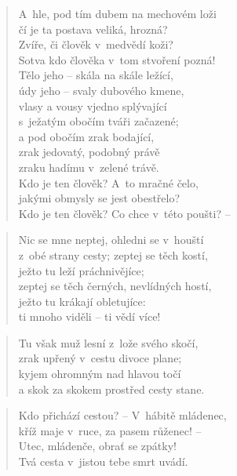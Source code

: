 \begin{verse}
A~hle, pod tím dubem na mechovém loži \\
čí je ta postava veliká, hrozná? \\
Zvíře, či člověk v~medvědí koži? \\
Sotva kdo člověka v~tom stvoření pozná! \\
Tělo jeho -- skála na skále ležící, \\
údy jeho -- svaly dubového kmene, \\
vlasy a vousy vjedno splývající \\
s~ježatým obočím tváři začazené; \\
a pod obočím zrak bodající, \\
zrak jedovatý, podobný právě \\
zraku hadímu v~zelené trávě. \\
Kdo je ten člověk? A~to mračné čelo, \\
jakými obmysly se jest obestřelo? \\
Kdo je ten člověk? Co chce v~této poušti? --
\end{verse}

\begin{verse}
Nic se mne neptej, ohledni se v~houští \\
z~obé strany cesty; zeptej se těch kostí, \\
ježto tu leží práchnivějíce; \\
zeptej se těch černých, nevlídných hostí, \\
ježto tu krákají obletujíce: \\
ti mnoho viděli -- ti vědí více!
\end{verse}

\begin{verse}
Tu však muž lesní z~lože svého skočí, \\
zrak upřený v~cestu divoce plane; \\
kyjem ohromným nad hlavou točí \\
a skok za skokem prostřed cesty stane.
\end{verse}

\begin{verse}
Kdo přichází cestou? -- V~hábitě mládenec, \\
kříž maje v~ruce, za pasem růženec! -- \\
Utec, mládenče, obrať se zpátky! \\
Tvá cesta v~jistou tebe smrt uvádí.
\end{verse}

